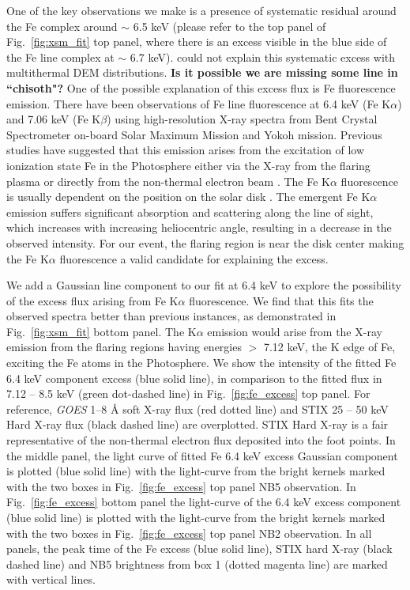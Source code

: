 \documentclass[lineno, pdflatex,sn-mathphys-ay]{sn-jnl}%
\begin{document}
One of the key observations we make is a presence of systematic residual around the Fe complex around $\sim$ 6.5 keV (please refer to the top panel of Fig.~\ref{fig:xsm_fit} top panel, where there is an excess visible in the blue side of the Fe line complex at $\sim$ 6.7 keV). \cite{mithun22} could not explain this systematic excess with multithermal DEM distributions. {\bf Is it possible we are missing some line in ``chisoth"?} One of the possible explanation of this excess flux is Fe fluorescence emission. There have been observations of Fe line fluorescence at 6.4 keV (Fe K$\alpha$) and 7.06 keV (Fe K$\beta$) \citep{neupert67,doscheck71,bai79,tanaka84,parmar84,phillips12} using high-resolution X-ray spectra from Bent Crystal Spectrometer on-board Solar Maximum Mission \citep[Bent/{\it SMM},][]{bent,smm} and Yokoh \citep{yokoh} mission. Previous studies have suggested that this emission arises from the excitation of low ionization state Fe in the Photosphere either via the X-ray from the flaring plasma \citep{bai79} or directly from the non-thermal electron beam \citep{phillips73}. The Fe K$\alpha$ fluorescence is usually dependent on the position on the solar disk \citep{parmar84}. The emergent Fe K$\alpha$ emission suffers significant absorption and scattering along the line of sight, which increases with increasing heliocentric angle, resulting in a decrease in the observed intensity. For our event, the flaring region is near the disk center making the Fe K$\alpha$ fluorescence a valid candidate for explaining the excess.

We add a Gaussian line component to our fit at 6.4 keV to explore the possibility of the excess flux arising from Fe K$\alpha$ fluorescence. We find that this fits the observed spectra better than previous instances, as demonstrated in Fig.~\ref{fig:xsm_fit} bottom panel. The K$\alpha$ emission would arise from the X-ray emission from the flaring regions having energies $>$ 7.12 keV, the K edge of Fe, exciting the Fe atoms in the Photosphere. We show the intensity of the fitted Fe 6.4 keV component excess (blue solid line), in comparison to the fitted flux in 7.12 {--} 8.5 keV (green dot-dashed line) in Fig.~\ref{fig:fe_excess} top panel. For reference, {\it GOES} 1{--}8 {\AA} soft X-ray flux (red dotted line) and STIX 25 {--} 50 keV Hard X-ray flux (black dashed line) are overplotted. STIX Hard X-ray is a fair representative of the non-thermal electron flux deposited into the foot points. In the middle panel, the light curve of fitted Fe 6.4 keV excess Gaussian component is plotted (blue solid line) with the light-curve from the bright kernels marked with the two boxes in Fig.~\ref{fig:fe_excess} top panel NB5 observation. In Fig.~\ref{fig:fe_excess} bottom panel the light-curve of the 6.4 keV excess component (blue solid line) is plotted with the light-curve from the bright kernels marked with the two boxes in Fig.~\ref{fig:fe_excess} top panel NB2 observation. In all panels, the peak time of the Fe excess (blue solid line), STIX hard X-ray (black dashed line) and NB5 brightness from box 1 (dotted magenta line) are marked with vertical lines.
\end{document}
